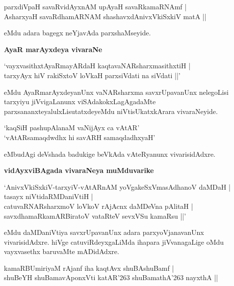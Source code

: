 \begin{shloka}
parxdiVpaH savaRvidAyxnAM upAyaH savaRkamaRNAmf |\\\label{89}
AsharxyaH savaRdhamARNAM shashavxdAnivxVkiSxkiV matA ||
\end{shloka}

\noindent
eMdu adara bagegx neYjavAda parxshaMseyide.

{\bigskip
\noindent
{\large\bf AyaR marAyxdeya vivaraNe}}\label{page90}
\medskip

\begin{shloka}
`vayxvasithxtAyaRmayARdaH kaqtavaNARsharxmasithxtiH |\\\label{90}
tarxyAyx hiV rakiSxtoV  loVkaH parxsiVdati na siVdati ||'
\end{shloka}

\noindent
eMdu AyaRmarAyxdeyanUnx vaNARsharxma savxrUpavanUnx nelegoLisi tarxyiyu jiVvigaLanunx viSAda\-kokxLa\-gAgadaMte parxsananxteyalulxLisutatxdeyeMdu niVtisUkatxkArara vivaraNeyide.

\begin{shloka}
`kaqSiH pashupAlanaM vaNijAyx ca vAtAR'\\\label{90}
`vAtARsamaqdwdhx hi savARH samaqdadhxyaH'\label{90}
\end{shloka}

\noindent
eMbudAgi deVshada badukige beVkAda vAteRyanunx vivarisidAdxre.

{\bigskip
\noindent
{\large\bf vidAyxviBAgada vivaraNeya muMduvarike}}\label{page90}
\medskip

\begin{shloka}
`AnivxVkiSxkiV-tarxyiV-vAtARnAM yoVgakeSxVmasAdhanoV daMDaH |\\\label{90}
tasayx niVtidaRMDaniVtiH |\\
catuvaRNARsharxmoV loVkoV rAjAcnx daMDeVna pAlitaH |\\\label{90}
savxdhamaRkamARBiratoV vataRteV sevxVSu kamaRsu ||'
\end{shloka}

\noindent
eMdu daMDaniVtiya savxrUpavanUnx adara parxyoVjanavanUnx vivarisidAdxre. hiVge catuviRdeyx\-gaLiMda ihapara jiVvanagaLige oMdu vayxvasethx baruvaMte mADidAdxre.

\begin{shloka}
kamaRBUmiriyaM rAjanf iha kaqtAvx shuBAshuBamf |\\\label{90}
shuBeYH shuBamavAponxVti katAR\char'263 shuBamathA\char'263 nayxthA ||
\end{shloka}

